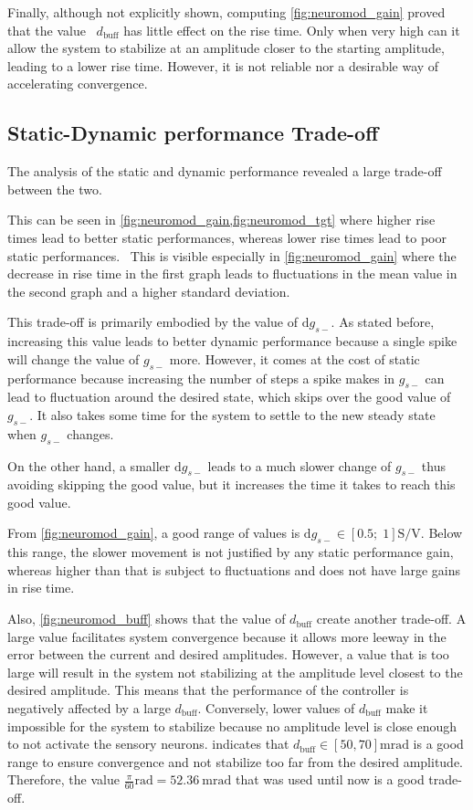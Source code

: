 Finally, although not explicitly shown, computing \cref{fig:neuromod_gain} proved that the value  $d_\text{buff}$ has little effect on the rise time.
Only when very high can it allow the system to stabilize at an amplitude closer to the starting amplitude, leading to a lower rise time.
However, it is not reliable nor a desirable way of accelerating convergence.

\subsection{Static-Dynamic performance Trade-off}

The analysis of the static and dynamic performance revealed a large trade-off between the two.

This can be seen in \cref{fig:neuromod_gain,fig:neuromod_tgt} where higher rise times lead to better static performances, whereas lower rise times lead to poor static performances. 
This is visible especially in \cref{fig:neuromod_gain} where the decrease in rise time in the first graph leads to fluctuations in the mean value in the second graph and a higher standard deviation.

This trade-off is primarily embodied by the value of $\mathrm{d}g_{s-}$.
As stated before, increasing this value leads to better dynamic performance because a single spike will change the value of $g_{s-}$ more.
However, it comes at the cost of static performance because increasing the number of steps a spike makes in $g_{s-}$ can lead to fluctuation around the desired state, which skips over the good value of $g_{s-}$.
It also takes some time for the system to settle to the new steady state when $g_{s-}$ changes.

On the other hand, a smaller $\mathrm{d}g_{s-}$ leads to a much slower change of $g_{s-}$ thus avoiding skipping the good value, but it increases the time it takes to reach this good value.

From \cref{fig:neuromod_gain}, a good range of values is $\mathrm{d}g_{s-} \in \left[0.5;\;1\right]\unit{\siemens\per\volt}$.
Below this range, the slower movement is not justified by any static performance gain, whereas higher than that is subject to fluctuations and does not have large gains in rise time.

Also, \cref{fig:neuromod_buff} shows that the value of $d_\text{buff}$ create another trade-off.
A large value facilitates system convergence because it allows more leeway in the error between the current and desired amplitudes.
However, a value that is too large will result in the system not stabilizing at the amplitude level closest to the desired amplitude.
This means that the performance of the controller is negatively affected by a large $d_\text{buff}$.
Conversely, lower values of $d_\text{buff}$ make it impossible for the system to stabilize because no amplitude level is close enough to not activate the sensory neurons.
 indicates that $d_\text{buff} \in \left[50, 70\right]\unit{\milli\radian}$ is a good range to ensure convergence and not stabilize too far from the desired amplitude. Therefore, the value $\frac{\pi}{60}\unit{\radian} = \qty{52.36}{\milli\radian}$ that was used until now is a good trade-off. 

